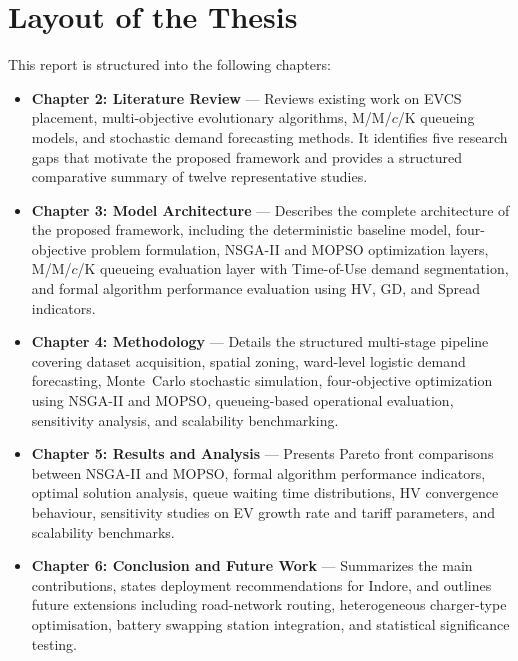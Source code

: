 \section{Layout of the Thesis}
\label{sec:intro_layout}

This report is structured into the following chapters:

\begin{itemize}
  \item \textbf{Chapter 2: Literature Review} --- Reviews existing work on
        EVCS placement, multi-objective evolutionary algorithms, M/M/$c$/K
        queueing models, and stochastic demand forecasting methods. It
        identifies five research gaps that motivate the proposed framework
        and provides a structured comparative summary of twelve
        representative studies.

  \item \textbf{Chapter 3: Model Architecture} --- Describes the complete
        architecture of the proposed framework, including the deterministic
        baseline model, four-objective problem formulation, NSGA-II and
        MOPSO optimization layers, M/M/$c$/K queueing evaluation layer with
        Time-of-Use demand segmentation, and formal algorithm performance
        evaluation using HV, GD, and Spread indicators.

  \item \textbf{Chapter 4: Methodology} --- Details the structured
        multi-stage pipeline covering dataset acquisition, spatial zoning,
        ward-level logistic demand forecasting, Monte~Carlo stochastic
        simulation, four-objective optimization using NSGA-II and MOPSO,
        queueing-based operational evaluation, sensitivity analysis, and
        scalability benchmarking.

  \item \textbf{Chapter 5: Results and Analysis} --- Presents Pareto front
        comparisons between NSGA-II and MOPSO, formal algorithm performance
        indicators, optimal solution analysis, queue waiting time
        distributions, HV convergence behaviour, sensitivity studies on
        EV growth rate and tariff parameters, and scalability benchmarks.

  \item \textbf{Chapter 6: Conclusion and Future Work} --- Summarizes the
        main contributions, states deployment recommendations for Indore,
        and outlines future extensions including road-network routing,
        heterogeneous charger-type optimisation, battery swapping station
        integration, and statistical significance testing.
\end{itemize}
